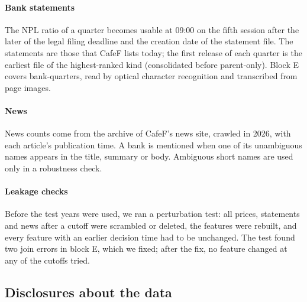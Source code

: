 \paragraph{Bank statements} The NPL ratio of a quarter becomes usable at 09:00 on the fifth session
after the later of the legal filing deadline and the creation date of the statement file. The
statements are those that CafeF lists today; the first release of each quarter is the earliest file
of the highest-ranked kind (consolidated before parent-only). Block E covers 
bank-quarters,  read by optical character recognition and 
transcribed from page images.

\paragraph{News} News counts come from the archive of CafeF's news site, crawled in 2026, with each
article's publication time. A bank is mentioned when one of its unambiguous names appears in the
title, summary or body. Ambiguous short names are used only in a robustness check.

\paragraph{Leakage checks} Before the test years were used, we ran a perturbation test: all prices,
statements and news after a cutoff were scrambled or deleted, the features were rebuilt, and every
feature with an earlier decision time had to be unchanged. The test found two join errors in block E,
which we fixed; after the fix, no feature changed at any of the cutoffs tried.

\subsection{Disclosures about the data}\label{sec:datalimits}

